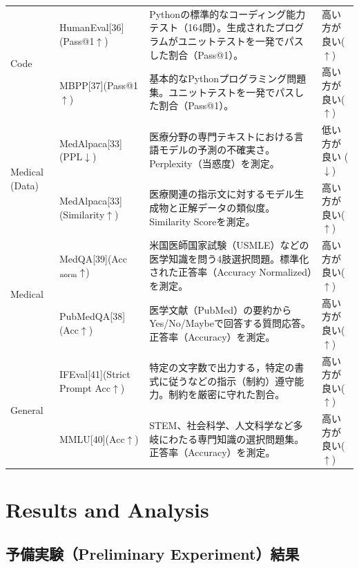 \documentclass{article}
\begin{document}
\begin{table}[htbp]
\begin{tabularx}{\textwidth}{p{2.0cm}p{3.3cm}Xp{2.2cm}}
\midrule
\multirow{2}{*}{Code}
& HumanEval[36](Pass@1$\uparrow$) & Pythonの標準的なコーディング能力テスト（164問）。生成されたプログラムがユニットテストを一発でパスした割合（Pass@1）。 & 高い方が良い($\uparrow$) \\
& MBPP[37](Pass@1$\uparrow$) & 基本的なPythonプログラミング問題集。ユニットテストを一発でパスした割合（Pass@1）。 & 高い方が良い($\uparrow$) \\
\midrule
\multirow{2}{*}{Medical (Data)}
& MedAlpaca[33](PPL$\downarrow$) & 医療分野の専門テキストにおける言語モデルの予測の不確実さ。Perplexity（当惑度）を測定。 & 低い方が良い ($\downarrow$) \\
& MedAlpaca[33](Similarity$\uparrow$) & 医療関連の指示文に対するモデル生成物と正解データの類似度。Similarity Scoreを測定。 & 高い方が良い($\uparrow$) \\
\midrule
\multirow{2}{*}{Medical}
& MedQA[39](Acc$_{\rm norm}\uparrow$) & 米国医師国家試験（USMLE）などの医学知識を問う4肢選択問題。標準化された正答率（Accuracy Normalized）を測定。 & 高い方が良い($\uparrow$) \\
& PubMedQA[38](Acc$\uparrow$) & 医学文献（PubMed）の要約からYes/No/Maybeで回答する質問応答。正答率（Accuracy）を測定。 & 高い方が良い($\uparrow$) \\
\midrule
\multirow{2}{*}{General}
& IFEval[41](Strict Prompt Acc$\uparrow$) & 特定の文字数で出力する，特定の書式に従うなどの指示（制約）遵守能力。制約を厳密に守れた割合。 & 高い方が良い($\uparrow$) \\
& MMLU[40](Acc$\uparrow$) & STEM、社会科学、人文科学など多岐にわたる専門知識の選択問題集。正答率（Accuracy）を測定。 & 高い方が良い($\uparrow$) \\
\bottomrule
\end{tabularx}
\end{table}


\section{Results and Analysis}

\subsection{予備実験（Preliminary Experiment）結果}
\end{document}

